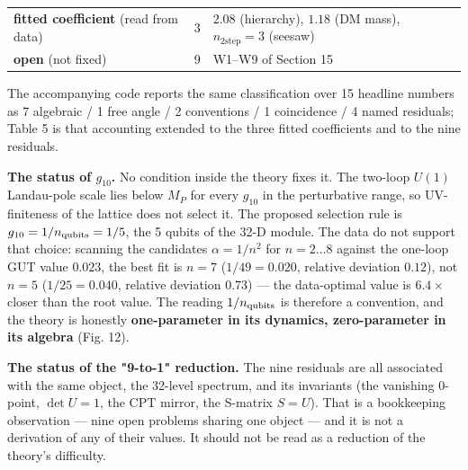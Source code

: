 \documentclass[aps,prd,amsmath,amssymb,superscriptaddress,longbibliography,floatfix,preprint]{revtex4-2}
\begin{document}
{\begin{longtable}{lll}
\arrayrulecolor{black!40}\hline\arrayrulecolor{black}
\parbox[c]{3.99cm}{\vspace{2.5pt}\raggedright {} \textbf{fitted coefficient} (read from data)\vspace{2.5pt}} & 3 & \parbox[c]{9.66cm}{\vspace{2.5pt}\raggedright {} \mbox{$2.08$} (hierarchy), \mbox{$1.18$} (DM mass), \mbox{$n_{2\text{step}} = 3$} (seesaw)\vspace{2.5pt}} \\
\hline{}
\parbox[c]{3.99cm}{\vspace{2.5pt}\raggedright {} \textbf{open} (not fixed)\vspace{2.5pt}} & 9 & \parbox[c]{9.66cm}{\vspace{2.5pt}\raggedright {} W1--W9 of Section 15\vspace{2.5pt}} \\
\end{longtable}
}

The accompanying code reports the same classification over 15 headline numbers as 7 algebraic / 1 free angle / 2 conventions / 1 coincidence / 4 named residuals; Table 5 is that accounting extended to the three fitted coefficients and to the nine residuals.

\textbf{The status of $g_{10}$.} No condition inside the theory fixes it. The two-loop $U(1)$ Landau-pole scale lies below $M_P$ for every $g_{10}$ in the perturbative range, so UV-finiteness of the lattice does not select it. The proposed selection rule is $g_{10} = 1/n_{\rm qubits} = 1/5$, the 5 qubits of the 32-D module. The data do not support that choice: scanning the candidates $\alpha = 1/n^2$ for $n = 2\dots8$ against the one-loop GUT value $0.023$, the best fit is $n = 7$ ($1/49 = 0.020$, relative deviation $0.12$), not $n = 5$ ($1/25 = 0.040$, relative deviation $0.73$) --- the data-optimal value is $6.4\times$ closer than the root value. The reading $1/n_{\rm qubits}$ is therefore a convention, and the theory is honestly \textbf{one-parameter in its dynamics, zero-parameter in its algebra} (Fig. 12).

\textbf{The status of the "9-to-1" reduction.} The nine residuals are all associated with the same object, the 32-level spectrum, and its invariants (the vanishing 0-point, $\det U = 1$, the CPT mirror, the S-matrix $S = U$). That is a bookkeeping observation --- nine open problems sharing one object --- and it is not a derivation of any of their values. It should not be read as a reduction of the theory's difficulty.
\end{document}
